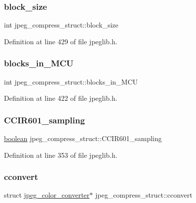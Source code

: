 \subsubsection{\texorpdfstring{block\_size}{block\_size}}
{\footnotesize\ttfamily int jpeg\+\_\+compress\+\_\+struct\+::block\+\_\+size}



Definition at line 429 of file jpeglib.\+h.

\mbox{\label{structjpeg__compress__struct_ac32cf016a916984f68f158e5310a16bb}} 
\subsubsection{\texorpdfstring{blocks\_in\_MCU}{blocks\_in\_MCU}}
{\footnotesize\ttfamily int jpeg\+\_\+compress\+\_\+struct\+::blocks\+\_\+in\+\_\+\+M\+CU}



Definition at line 422 of file jpeglib.\+h.

\mbox{\label{structjpeg__compress__struct_abf474ed47e9f0a9c066bc47de5b0e8e7}} 
\subsubsection{\texorpdfstring{CCIR601\_sampling}{CCIR601\_sampling}}
{\footnotesize\ttfamily \mbox{\hyperlink{jmorecfg_8h_a7c6368b321bd9acd0149b030bb8275ed}{boolean}} jpeg\+\_\+compress\+\_\+struct\+::\+C\+C\+I\+R601\+\_\+sampling}



Definition at line 353 of file jpeglib.\+h.

\mbox{\label{structjpeg__compress__struct_a7c51e665f18d6e5a0fed053c470f4914}} 
\subsubsection{\texorpdfstring{cconvert}{cconvert}}
{\footnotesize\ttfamily struct \mbox{\hyperlink{structjpeg__color__converter}{jpeg\+\_\+color\+\_\+converter}}$\ast$ jpeg\+\_\+compress\+\_\+struct\+::cconvert}



